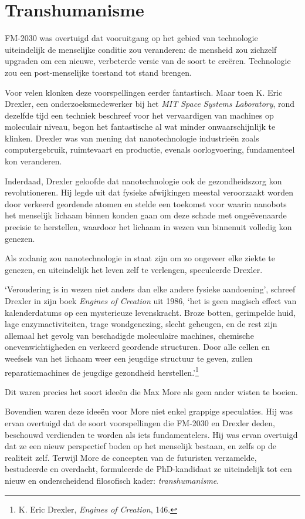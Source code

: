 \documentclass[
  a5paper,
  smalldemyvopaper,11pt,twoside,onecolumn,openright,extrafontsizes,
hidelinks]{memoir}
\begin{document}
\section{Transhumanisme}\label{transhumanisme}

FM-2030 was overtuigd dat vooruitgang op het gebied van technologie
uiteindelijk de menselijke conditie zou veranderen: de mensheid zou
zichzelf upgraden om een nieuwe, verbeterde versie van de soort te
creëren. Technologie zou een post-menselijke toestand tot stand brengen.

Voor velen klonken deze voorspellingen eerder fantastisch. Maar toen K.
Eric Drexler, een onderzoeksmedewerker bij het \emph{MIT Space Systems
Laboratory}, rond dezelfde tijd een techniek beschreef voor het
vervaardigen van machines op moleculair niveau, begon het fantastische
al wat minder onwaarschijnlijk te klinken. Drexler was van mening dat
nanotechnologie industrieën zoals computergebruik, ruimtevaart en
productie, evenals oorlogvoering, fundamenteel kon veranderen.

Inderdaad, Drexler geloofde dat nanotechnologie ook de gezondheidszorg
kon revolutioneren. Hij legde uit dat fysieke afwijkingen meestal
veroorzaakt worden door verkeerd geordende atomen en stelde een toekomst
voor waarin nanobots het menselijk lichaam binnen konden gaan om deze
schade met ongeëvenaarde precisie te herstellen, waardoor het lichaam in
wezen van binnenuit volledig kon genezen.

Als zodanig zou nanotechnologie in staat zijn om zo ongeveer elke ziekte
te genezen, en uiteindelijk het leven zelf te verlengen, speculeerde
Drexler.

`Veroudering is in wezen niet anders dan elke andere fysieke
aandoening', schreef Drexler in zijn boek \emph{Engines of Creation} uit
1986, `het is geen magisch effect van kalenderdatums op een mysterieuze
levenskracht. Broze botten, gerimpelde huid, lage enzymactiviteiten,
trage wondgenezing, slecht geheugen, en de rest zijn allemaal het gevolg
van beschadigde moleculaire machines, chemische onevenwichtigheden en
verkeerd geordende structuren. Door alle cellen en weefsels van het
lichaam weer een jeugdige structuur te geven, zullen reparatiemachines
de jeugdige gezondheid herstellen.'\footnote{K. Eric Drexler,
  \emph{Engines of Creation}, 146.}

Dit waren precies het soort ideeën die Max More als geen ander wisten te
boeien.

Bovendien waren deze ideeën voor More niet enkel grappige speculaties.
Hij was ervan overtuigd dat de soort voorspellingen die FM-2030 en
Drexler deden, beschouwd verdienden te worden als iets fundamentelers.
Hij was ervan overtuigd dat ze een nieuw perspectief boden op het
menselijk bestaan, en zelfs op de realiteit zelf. Terwijl More de
concepten van de futuristen verzamelde, bestudeerde en overdacht,
formuleerde de PhD-kandidaat ze uiteindelijk tot een nieuw en
onderscheidend filosofisch kader: \emph{transhumanisme}.
\end{document}

